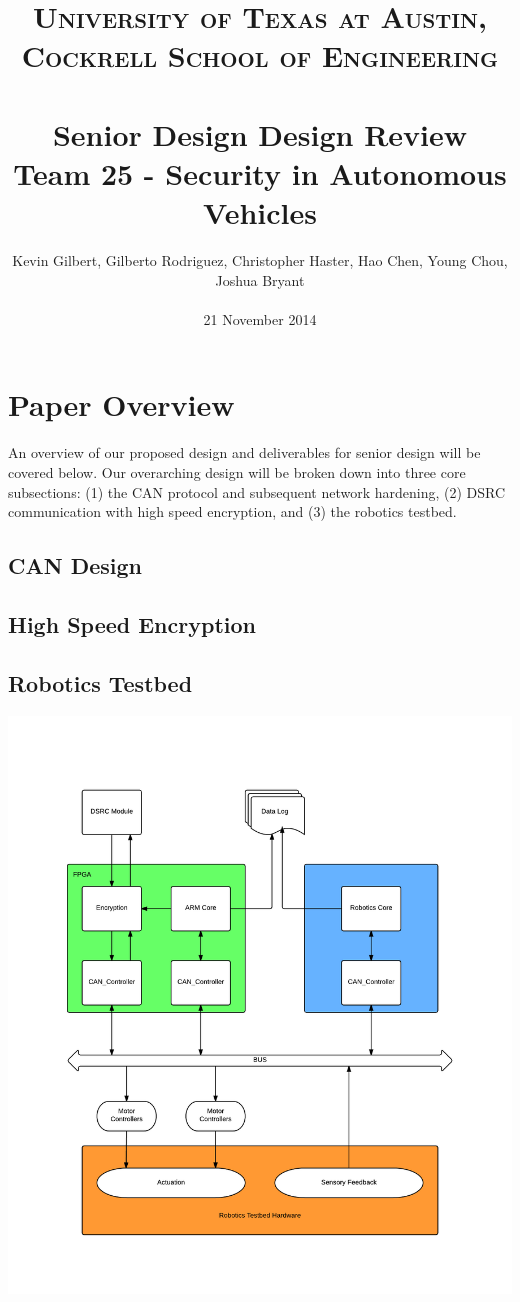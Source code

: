 \documentclass[paper=a4, fontsize=11pt]{scrartcl}
\title{
		\usefont{OT1}{bch}{b}{n}
		\normalfont \normalsize \textsc{University of Texas at Austin, Cockrell School of Engineering} \\ [25pt]
		\horrule{0.5pt} \\[0.4cm]
		\huge Senior Design Design Review\\
        Team 25 - Security in Autonomous Vehicles
		\horrule{2pt} \\[0.5cm]
}
\author{
		\normalfont \normalsize
        Kevin Gilbert, Gilberto Rodriguez, Christopher Haster, Hao Chen, Young Chou, Joshua Bryant\\[-3pt]\\
        \normalsize
        21 November 2014
}
\date{}
\numberwithin{equation}{section}		%
\numberwithin{figure}{section}			%
\numberwithin{table}{section}				%
\begin{document}
\maketitle

\newpage

\section{Paper Overview}
An overview of our proposed design and deliverables for senior design will be covered below. Our overarching design will be broken down into three core subsections: (1) the CAN protocol and subsequent network hardening, (2) DSRC communication with high speed encryption, and (3) the robotics testbed.

\subsection{CAN Design}

\subsection{High Speed Encryption}

\subsection{Robotics Testbed}

\newpage

\begin{center}
	\includegraphics[width = \textwidth]{images/Bus_Layout}
\end{center}

\end{document}
